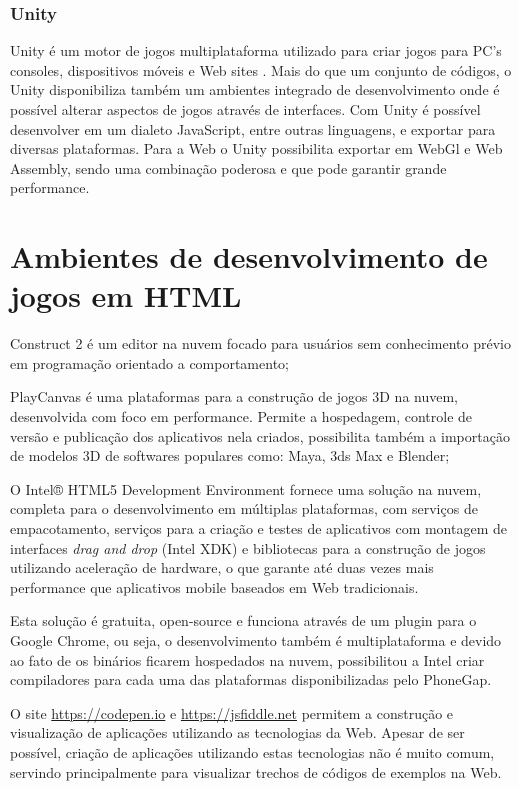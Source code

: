 \subsection{Unity}

Unity é um motor de jogos multiplataforma utilizado para criar jogos
para PC's consoles, dispositivos móveis e Web sites \autocite{unity}.
Mais do que um conjunto de códigos, o Unity disponibiliza também
um ambientes integrado de desenvolvimento onde é possível alterar
aspectos de jogos através de interfaces. Com Unity é possível
desenvolver em um dialeto JavaScript, entre outras linguagens, e
exportar para diversas plataformas. Para a Web o Unity possibilita
exportar em WebGl e Web Assembly, sendo uma combinação poderosa e que
pode garantir grande performance.


\chapter{Ambientes de desenvolvimento de jogos em HTML}

Construct 2 é um editor na nuvem focado para usuários sem
conhecimento prévio em programação orientado a comportamento;

PlayCanvas é uma plataformas para a construção de jogos 3D
na nuvem, desenvolvida com foco em performance. Permite a hospedagem,
controle de versão e publicação dos aplicativos nela criados,
possibilita também a importação de modelos 3D de softwares populares
como: Maya, 3ds Max e Blender;

O Intel® HTML5 Development Environment fornece uma solução na nuvem,
completa para o desenvolvimento em múltiplas plataformas, com serviços de
empacotamento, serviços para a criação e testes de aplicativos com
montagem de interfaces \textit{drag and drop} (Intel XDK) e bibliotecas
para a construção de jogos utilizando aceleração de hardware, o que
garante até duas vezes mais performance que aplicativos mobile baseados
em Web tradicionais.

Esta solução é gratuita, open-source e funciona através de um
plugin para o Google Chrome, ou seja, o desenvolvimento também é
multiplataforma e devido ao fato de os binários ficarem hospedados
na nuvem, possibilitou a Intel criar compiladores para cada uma das
plataformas disponibilizadas pelo PhoneGap.

O site \url{https://codepen.io} e \url{https://jsfiddle.net} permitem a
construção e visualização de aplicações utilizando as tecnologias
da Web. Apesar de ser possível, criação de aplicações utilizando
estas tecnologias não é muito comum, servindo principalmente para
visualizar trechos de códigos de exemplos na Web.

